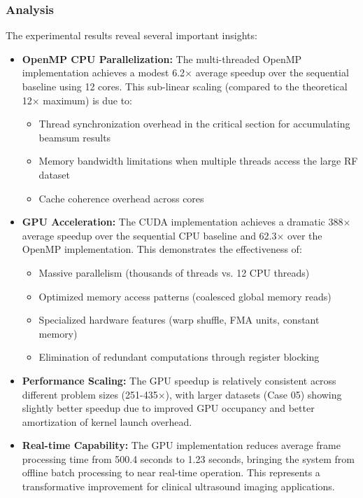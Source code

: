 \documentclass{article}
\begin{document}
\subsubsection{Analysis}

The experimental results reveal several important insights:

\begin{itemize}
    \item \textbf{OpenMP CPU Parallelization:} The multi-threaded OpenMP implementation achieves a modest 6.2$\times$ average speedup over the sequential baseline using 12 cores. This sub-linear scaling (compared to the theoretical 12$\times$ maximum) is due to:
    \begin{itemize}
        \item Thread synchronization overhead in the critical section for accumulating beamsum results
        \item Memory bandwidth limitations when multiple threads access the large RF dataset
        \item Cache coherence overhead across cores
    \end{itemize}

    \item \textbf{GPU Acceleration:} The CUDA implementation achieves a dramatic 388$\times$ average speedup over the sequential CPU baseline and 62.3$\times$ over the OpenMP implementation. This demonstrates the effectiveness of:
    \begin{itemize}
        \item Massive parallelism (thousands of threads vs. 12 CPU threads)
        \item Optimized memory access patterns (coalesced global memory reads)
        \item Specialized hardware features (warp shuffle, FMA units, constant memory)
        \item Elimination of redundant computations through register blocking
    \end{itemize}

    \item \textbf{Performance Scaling:} The GPU speedup is relatively consistent across different problem sizes (251-435$\times$), with larger datasets (Case 05) showing slightly better speedup due to improved GPU occupancy and better amortization of kernel launch overhead.

    \item \textbf{Real-time Capability:} The GPU implementation reduces average frame processing time from 500.4 seconds to 1.23 seconds, bringing the system from offline batch processing to near real-time operation. This represents a transformative improvement for clinical ultrasound imaging applications.
\end{itemize}
\end{document}
